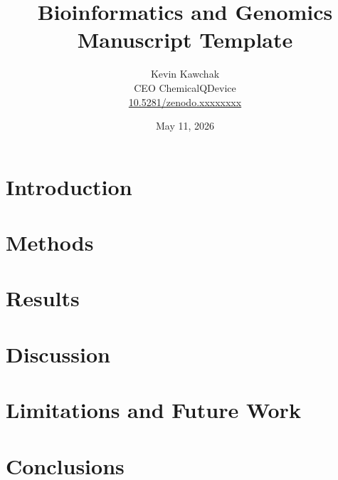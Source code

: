 \documentclass[11pt]{article}
\title{Bioinformatics and Genomics Manuscript Template}
\author{
  Kevin Kawchak\hspace{2pt}\orcidicon{0009-0007-5457-8667} \\
  CEO ChemicalQDevice\\
  \href{https://doi.org/10.5281/zenodo.xxxxxxxx}{10.5281/zenodo.xxxxxxxx} \\
}
\date{May 11, 2026}
\begin{document}
\maketitle

\begin{abstract}

\end{abstract}

\keywords{ }

\vspace{-0.2cm}

\section{Introduction}
\label{sec:introduction}


\tableofcontents
\vspace{0.4cm}

\newpage
\section{Methods}
\label{sec:methods}

\newpage

\section{Results}
\label{sec:results}

\newpage

\section{Discussion}
\label{sec:discussion}


\section{Limitations and Future Work}
\label{sec:limitations}

\newpage

\section{Conclusions}
\label{sec:conclusions}

\newpage

{}
\begingroup
\raggedright


\endgroup
\newpage


\end{document}
